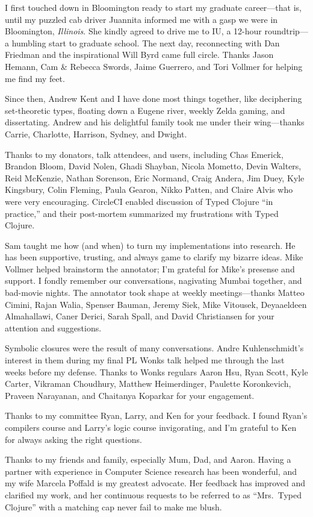 I first touched down in Bloomington ready to start my graduate career---that is, until 
my puzzled cab driver Juannita informed me with a gasp
we were in Bloomington, \emph{Illinois}.
She kindly agreed to drive me to IU, a 12-hour roundtrip---a humbling start to graduate school.
The next day, reconnecting with Dan Friedman and the inspirational Will Byrd came full circle.
Thanks Jason Hemann, Cam \& Rebecca Swords, Jaime Guerrero, 
and Tori Vollmer for helping me find my feet.

Since then, Andrew Kent and I have done most things together, like deciphering 
set-theoretic types, floating down a Eugene river,
weekly Zelda gaming, and dissertating.
Andrew and his delightful family took me under their wing---thanks
Carrie, Charlotte, Harrison, Sydney, and Dwight.

Thanks to my donators, talk attendees, and users, including
Chas Emerick, Brandon Bloom, David Nolen,
Ghadi Shayban, Nicola Mometto, Devin Walters, Reid McKenzie, Nathan Sorenson, Eric
Normand, Craig Andera, Jim Duey, Kyle Kingsbury, Colin Fleming, Paula Gearon,
Nikko Patten, and Claire Alvis who were very encouraging.
CircleCI enabled discussion of Typed Clojure ``in practice,'' and their post-mortem
summarized my frustrations with Typed Clojure.

Sam taught me how (and when) to turn my implementations into research.
He has been supportive, trusting, and always game to clarify my bizarre ideas.
Mike Vollmer helped brainstorm the annotator;
I'm grateful for Mike's presense and support. I fondly remember our
conversations, nagivating Mumbai together, and bad-movie nights.
The annotator took shape at weekly meetings---thanks
Matteo Cimini, Rajan Walia, Spenser Bauman, Jeremy Siek, Mike Vitousek, Deyaaeldeen Almahallawi,
Caner Derici, Sarah Spall, and David Christiansen for your attention and suggestions.

Symbolic closures were the result of many conversations.
Andre Kuhlenschmidt's interest in them during my final PL Wonks talk
helped me through the last weeks before my defense.
Thanks to Wonks regulars Aaron Hsu, 
Ryan Scott, Kyle Carter, 
Vikraman Choudhury, Matthew Heimerdinger, Paulette Koronkevich, Praveen Narayanan,
and Chaitanya Koparkar for your engagement.

Thanks to my committee Ryan, Larry, and Ken for your feedback.
I found Ryan's compilers course and Larry's logic course invigorating,
and I'm grateful to Ken for always asking the right questions.

Thanks to my friends and family, especially Mum, Dad, and Aaron.
Having a partner with experience in Computer Science research has been wonderful, 
and my wife Marcela Poffald is my greatest advocate.
Her feedback has improved and clarified my work,
and her continuous requests
to be referred to as ``Mrs.~Typed Clojure'' with a matching cap never
fail to make me blush.
